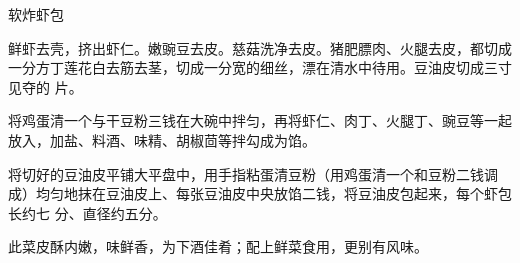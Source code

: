 \begin{recipe}{软炸虾包}

\ingredients


\preparation

\step 鲜虾去壳，挤出虾仁。嫩豌豆去皮。慈菇洗净去皮。猪肥膘肉、火腿去皮，都切成
一分方丁莲花白去筋去茎，切成一分宽的细丝，漂在清水中待用。豆油皮切成三寸见夺的
片。

\step 将鸡蛋清一个与干豆粉三钱在大碗中拌匀，再将虾仁、肉丁、火腿丁、豌豆等一起
放入，加盐、料酒、味精、胡椒茴等拌勾成为馅。

\step 将切好的豆油皮平铺大平盘中，用手指粘蛋清豆粉（用鸡蛋清一个和豆粉二钱调
成）均匀地抹在豆油皮上、每张豆油皮中央放馅二钱，将豆油皮包起来，每个虾包长约七
分、直径约五分。

\features

此菜皮酥内嫩，味鲜香，为下酒佳肴；配上鲜菜食用，更别有风味。

\end{recipe}

